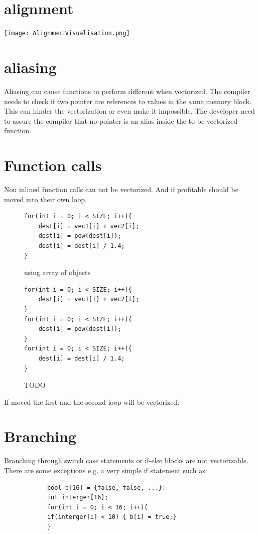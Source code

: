 \documentclass[
	12pt,
	a4paper,
	BCOR10mm,
	DIV14,
	headsepline,
	usegeometry,
]{scrreprt}
\begin{document}
\section{alignment}
\texttt{[image: AlignmentVisualisation.png]}
\section{aliasing}
Aliasing can cause functions to perform different when vectorized. The compiler needs to check if
two pointer are references to values in the same memory block. This can hinder the vectorization or
even make it impossible. The developer need to assure the compiler that no pointer is an alias
inside the to be vectorized function.
\section{Function calls}
Non inlined function calls can not be vectorized. And if profitable should be moved into their own
loop. \cite{ExternalFunctionSource}

\begin{figure}[h]
    \centering
    \begin{minipage}[t]{.45\textwidth}
        \begin{verbatim}
for(int i = 0; i < SIZE; i++){
    dest[i] = vec1[i] + vec2[i];
    dest[i] = pow(dest[i]);
    dest[i] = dest[i] / 1.4;
}
        \end{verbatim}

        \caption{using array of objects}
    \end{minipage}
    \begin{minipage}[t]{.45\textwidth}
        \begin{verbatim}
for(int i = 0; i < SIZE; i++){
    dest[i] = vec1[i] + vec2[i];
}
for(int i = 0; i < SIZE; i++){
    dest[i] = pow(dest[i]);
}
for(int i = 0; i < SIZE; i++){
    dest[i] = dest[i] / 1.4;
}
        \end{verbatim}
    \caption{TODO}
    \label{fig:obj_load}
    \end{minipage}
\end{figure} 
If moved the first and the second loop will be vectorized. 

\section{Branching}
Branching through switch case statements or if-else blocks are not vectorizable. There are some
exceptions e.g. a very simple if statement such as:
        \begin{verbatim}
            bool b[16] = {false, false, ...}:
            int interger[16];
            for(int i = 0; i < 16; i++){
            if(interger[i] < 10) { b[i] = true;}
            }
        \end{verbatim}
\end{document}
